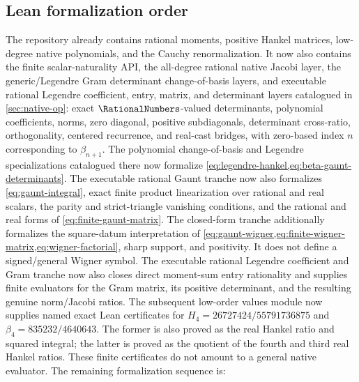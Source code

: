 \documentclass[11pt,oneside]{article}
\theoremstyle{definition}
\theoremstyle{remark}
\numberwithin{equation}{section}
\begin{document}
\subsection{Lean formalization order}
The repository already contains rational moments, positive Hankel matrices,
low-degree native polynomials, and the Cauchy renormalization. It now also contains
the finite scalar-naturality API, the all-degree rational native Jacobi layer,
the generic/Legendre Gram determinant change-of-basis layers, and executable
rational Legendre coefficient, entry, matrix, and determinant layers
catalogued in \cref{sec:native-op}: exact \(\RationalNumbers\)-valued determinants, polynomial
coefficients, norms, zero diagonal, positive subdiagonals, determinant cross-ratio,
orthogonality, centered recurrence, and real-cast bridges, with zero-based index
\(n\) corresponding to \(\beta_{n+1}\).  The polynomial change-of-basis and Legendre
specializations catalogued there now formalize
\cref{eq:legendre-hankel,eq:beta-gaunt-determinants}.  The executable rational
Gaunt tranche now also formalizes \eqref{eq:gaunt-integral}, exact finite product
linearization over rational and real scalars, the parity and strict-triangle vanishing
conditions, and the rational and real forms of \eqref{eq:finite-gaunt-matrix}.
The closed-form tranche additionally formalizes the square-datum interpretation of
\cref{eq:gaunt-wigner,eq:finite-wigner-matrix,eq:wigner-factorial}, sharp support,
and positivity.  It does not define a signed/general Wigner symbol.  The executable
rational Legendre coefficient and
Gram tranche now also closes direct moment-sum entry rationality and supplies finite
evaluators for the Gram matrix, its positive determinant, and the resulting genuine
norm/Jacobi ratios.  The subsequent low-order values module now supplies named exact
Lean certificates for \(H_4=26727424/55791736875\) and
\(\beta_4=835232/4640643\).  The former is also proved as the real Hankel ratio
and squared integral; the latter is proved as the quotient of the fourth and third
real Hankel ratios.  These finite certificates do not amount to a general native evaluator.
The remaining formalization sequence is:
\end{document}
